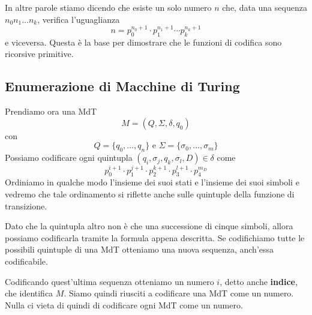 In altre parole stiamo dicendo che esiste un solo numero $n$
che, data una sequenza $n_0 n_1 \dots n_k$, verifica
l'uguaglianza
\[
	n = p_0^{n_0 + 1} \cdot p_1^{n_1 + 1} \cdots
	p_k^{n_k + 1}
\]
e viceversa. Questa è la base per dimostrare che le funzioni
di codifica sono ricorsive primitive.

\subsection{Enumerazione di Macchine di Turing}
Prendiamo ora una MdT
\[ M = (Q, \Sigma, \delta, q_0) \]
con
\[
	Q = \{ q_0, \dots, q_n \} \text { e }
	\Sigma = \{ \sigma_0, \dots, \sigma_m \}
\]
Possiamo codificare ogni quintupla
$(q_i, \sigma_j, q_k, \sigma_l, D) \in \delta$ come
\[
	p_0^{i+1} \cdot p_1^{j+1} \cdot
	p_2^{k+1} \cdot p_3^{l+1} \cdot p_4^{m_D}
\]
Ordiniamo in qualche modo l'insieme dei suoi stati e l'insieme
dei suoi simboli e vedremo che tale ordinamento si riflette
anche sulle quintuple della funzione di transizione.

Dato che la quintupla altro non è che una successione di cinque
simboli, allora possiamo codificarla tramite la formula appena
descritta. Se codifichiamo tutte le possibili quintuple di una
MdT otteniamo una nuova sequenza, anch'essa codificabile.

Codificando quest'ultima sequenza otteniamo un numero $i$,
detto anche \textbf{indice}, che identifica $M$. Siamo quindi
riusciti a codificare una MdT come un numero. Nulla ci vieta
di quindi di codificare ogni MdT come un numero.

